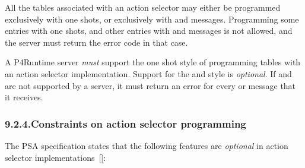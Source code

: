 \documentclass[11pt]{article}
\begin{document}
{%
All the tables associated with an action selector may either be programmed
exclusively with one shots, or exclusively with  and
 messages. Programming some entries with one shots, and
other entries with  and  messages is
not allowed, and the server must return the error code  in
that case.%

A P4Runtime server \emph{must} support the one shot style of programming tables with
an action selector implementation. Support for the  and
 style is \emph{optional}.  If  and
 are not supported by a server, it must return an
 error for every  or 
message that it receives.%

\subsubsection{9.2.4.\hspace*{0.5em}Constraints on action selector programming}\label{action-selector-constraints}%

\noindent{}The PSA specification states that the following features are \emph{optional} in
action selector implementations~[]:%

}
\end{document}
